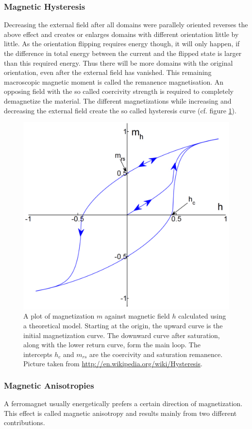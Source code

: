 \documentclass[a4paper]{scrartcl}
\numberwithin{equation}{section}
\numberwithin{figure}{section}
\numberwithin{table}{section}
\begin{document}
\subsubsection*{Magnetic Hysteresis}
Decreasing the external field after all domains were parallely oriented reverses the above effect and creates or enlarges domains with different orientation little by little. As the orientation flipping requires energy though, it will only happen, if the difference in total energy between the current and the flipped state is larger than this required energy. Thus there will be more domains with the original orientation, even after the external field has vanished. This remaining macroscopic magnetic moment is called the remanence magnetisation. An opposing field with the so called coercivity strength is required to completely demagnetize the material. The different magnetizations while increasing and decreasing the external field create the so called hysteresis curve (cf. figure \ref{fig:hys}).
\begin{figure}
        \begin{center}
         \includegraphics[width=0.31\linewidth]{img/hys.pdf}
        \end{center}
        \caption{
\small A plot of magnetization $m$ against magnetic field $h$ calculated using a theoretical model. Starting at the origin, the upward curve is the initial magnetization curve. The downward curve after saturation, along with the lower return curve, form the main loop. The intercepts $h_c$ and $m_{rs}$ are the coercivity and saturation remanence. Picture taken from \url{http://en.wikipedia.org/wiki/Hysteresis}.
        }
        \label{fig:hys}
\end{figure}


\subsubsection*{Magnetic Anisotropies}
A ferromagnet usually energetically prefers a certain direction of magnetization. This effect is called magnetic anisotropy and results mainly from two different contributions.
\end{document}
